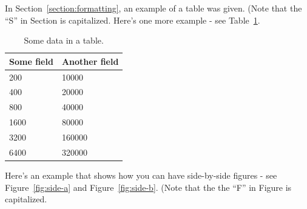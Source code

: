 \documentclass[pageno]{jpaper}
\begin{document}
In Section~\ref{section:formatting}, an example of a table was given.
(Note that the ``S'' in Section is capitalized.  Here's one more
example - see Table~\ref{table:data}.

\begin{table}[hbt]
	\centering
	\begin{tabular}{|l|l|} \hline
		\textbf{Some field} & \textbf{Another field}\\\hline
		200          &  10000 \\ \hline 
		400          &  20000 \\ \hline 
		800          &  40000 \\ \hline 
		1600        &  80000 \\ \hline 
		3200        &  160000 \\ \hline 
		6400        &  320000 \\ \hline 
	\end{tabular}
	\caption{Some data in a table. }
	\label{table:data}
\end{table}


Here's an example that shows how you can have side-by-side figures -
see Figure~\ref{fig:side-a} and Figure~\ref{fig:side-b}.  (Note that
the the ``F'' in Figure is capitalized. 
\end{document}
